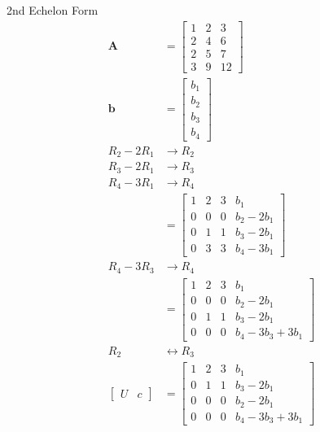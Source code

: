 \documentclass[main.tex]{subfiles}
\begin{document}
\begin{enumerate}
    2nd Echelon Form
    $$
    \begin{aligned}
    \boldsymbol{A} &=\left[\begin{array}{llc}
    1 & 2 & 3 \\
    2 & 4 & 6 \\
    2 & 5 & 7 \\
    3 & 9 & 12
    \end{array}\right] \\
    \boldsymbol{b} &=\left[\begin{array}{l}
    b_{1} \\
    b_{2} \\
    b_{3} \\
    b_{4}
    \end{array}\right]\\
    R_2 - 2R_1 &\rightarrow R_2\\
    R_3 - 2R_1 &\rightarrow R_3\\
    R_4 - 3R_1 &\rightarrow R_4\\
    &=\left[\begin{array}{cccc}
    1 & 2 & 3 & b_{1} \\
    0 & 0 & 0 & b_{2}-2 b_{1} \\
    0 & 1 & 1 & b_{3}-2 b_{1} \\
    0 & 3 & 3 & b_{4}-3 b_{1}
    \end{array}\right]\\
    R_4 - 3R_3 &\rightarrow R_4\\
    &=\left[\begin{array}{cccc}
    1 & 2 & 3 & b_{1} \\
    0 & 0 & 0 & b_{2}-2 b_{1} \\
    0 & 1 & 1 & b_{3}-2 b_{1} \\
    0 & 0 & 0 & b_{4}-3 b_{3}+3 b_{1}
    \end{array}\right]\\
    R_2 &\leftrightarrow R_3\\
    \left[\begin{array}{ll}
    U & c
    \end{array}\right] &= \left[\begin{array}{cccc}
    1 & 2 & 3 & b_{1} \\
    0 & 1 & 1 & b_{3}- 2 b_{1} \\
    0 & 0 & 0 & b_{2}- 2 b_{1} \\
    0 & 0 & 0 & b_{4}- 3 b_{3}+ 3 b_{1}
    \end{array}\right]
    \end{aligned}
    $$


\end{enumerate}
\end{document}
